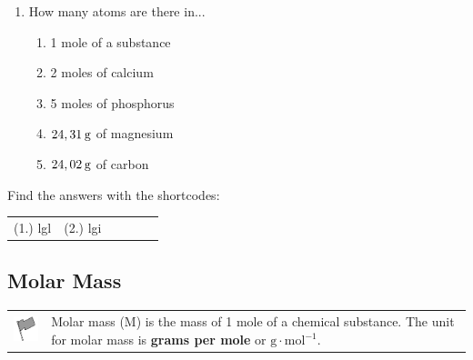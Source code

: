 \begin{enumerate}[noitemsep, label=\textbf{\arabic*}. ]
    \par
          \label{m38717*uid3}\item 
How many atoms are there in...
\label{m38717*id276311}\begin{enumerate}[noitemsep, label=\textbf{\alph*}. ] 
            \label{m38717*uid4}\item 1 mole of a substance
\label{m38717*uid5}\item 2 moles of calcium
\label{m38717*uid6}\item 5 moles of phosphorus
\label{m38717*uid7}\item \begin{math}24,31\phantom{\rule{2pt}{0ex}}\mathrm{g}\end{math} of magnesium
\label{m38717*uid8}\item \begin{math}24,02\phantom{\rule{2pt}{0ex}}\mathrm{g}\end{math} of carbon
\end{enumerate}
                \end{enumerate}
        
      

    
    \label{m38717*cid3}
\par {} Find the answers with the shortcodes:
 \par \begin{tabular}[h]{cccccc}
 (1.) lgl  &  (2.) lgi  & \end{tabular}



            \subsection{ Molar Mass}
            \nopagebreak
            
      
\par
            \label{m38717*fhsst!!!underscore!!!id147}\begin{definition}
	  \begin{tabular*}{15 cm}{m{15 mm}m{}}
	\hspace*{-50pt}  \includegraphics[width=0.5in]{col11305.imgs/psflag2.png}   & \Definition{   \label{id2496969}\textbf{ Molar mass }} { \label{m38717*meaningfhsst!!!underscore!!!id147}
      \label{m38717*id276397}Molar mass (M) is the mass of 1 mole of a chemical substance. The unit for molar mass is \textbf{grams per mole} or \begin{math}\mathrm{g}\ensuremath{\cdot}\mathrm{mol}{}^{-1}\end{math}. \par 
       } 
      \end{tabular*}
      \end{definition}

